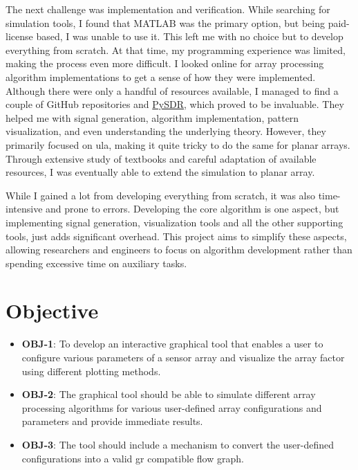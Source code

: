 The next challenge was implementation and verification. While searching for simulation tools, I found that MATLAB was the primary option, but being paid-license based, I was unable to use it. This left me with no choice but to develop everything from scratch. At that time, my programming experience was limited, making the process even more difficult. I looked online for array processing algorithm implementations to get a sense of how they were implemented. Although there were only a handful of resources available, I managed to find a couple of GitHub repositories and \href{https://pysdr.org/}{PySDR}, which proved to be invaluable. They helped me with signal generation, algorithm implementation, pattern visualization, and even understanding the underlying theory. However, they primarily focused on \acf{ula}, making it quite tricky to do the same for planar arrays. Through extensive study of textbooks and careful adaptation of available resources, I was eventually able to extend the simulation to planar array.

While I gained a lot from developing everything from scratch, it was also time-intensive and prone to errors. Developing the core algorithm is one aspect, but implementing signal generation, visualization tools and all the other supporting tools, just adds significant overhead. This project aims to simplify these aspects, allowing researchers and engineers to focus on algorithm development rather than spending excessive time on auxiliary tasks.

\section{Objective} \label{sec: objective}

\begin{itemize}
	\item \textbf{OBJ-1}: To develop an interactive graphical tool that enables a user to configure various parameters of a sensor array and visualize the array factor using different plotting methods.
	\item \textbf{OBJ-2}: The graphical tool should be able to simulate different array processing algorithms for various user-defined array configurations and parameters and provide immediate results.
	\item \textbf{OBJ-3}: The tool should include a mechanism to convert the user-defined configurations into a valid \acl{gr} compatible flow graph.
	
\end{itemize}

